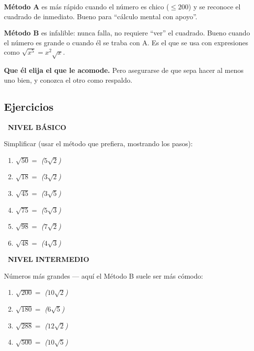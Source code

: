 \documentclass[11pt,a4paper]{article}
\newcommand{\nivelbasico}{%
  \par\smallskip\colorbox{green!60!black}{\color{white}\small\bfseries\ NIVEL BÁSICO\ }\par\smallskip}
\newcommand{\nivelintermedio}{%
  \par\smallskip\colorbox{naranja}{\color{white}\small\bfseries\ NIVEL INTERMEDIO\ }\par\smallskip}
\begin{document}
\begin{tcolorbox}[guia-tutor, title={\color{tutormorado} CUÁNDO USAR A Y CUÁNDO B}]
\textbf{Método A} es más rápido cuando el número es chico ($\leq 200$) y se reconoce el cuadrado de inmediato. Bueno para ``cálculo mental con apoyo''.

\textbf{Método B} es infalible: nunca falla, no requiere ``ver'' el cuadrado. Bueno cuando el número es grande o cuando él se traba con A. Es el que se usa con expresiones como $\sqrt{x^{5}} = x^{2}\sqrt{x}$.

\textbf{Que él elija el que le acomode.} Pero asegurarse de que sepa hacer al menos uno bien, y conozca el otro como respaldo.
\end{tcolorbox}

\subsection{Ejercicios}

\nivelbasico

Simplificar (usar el método que prefiera, mostrando los pasos):
\begin{enumerate}[label=\textbf{\arabic*.},leftmargin=1cm,itemsep=8pt]
  \item $\sqrt{50} = $ \hfill \textit{($5\sqrt{2}$)}
  \item $\sqrt{18} = $ \hfill \textit{($3\sqrt{2}$)}
  \item $\sqrt{45} = $ \hfill \textit{($3\sqrt{5}$)}
  \item $\sqrt{75} = $ \hfill \textit{($5\sqrt{3}$)}
  \item $\sqrt{98} = $ \hfill \textit{($7\sqrt{2}$)}
  \item $\sqrt{48} = $ \hfill \textit{($4\sqrt{3}$)}
\end{enumerate}

\nivelintermedio

Números más grandes --- aquí el Método B suele ser más cómodo:
\begin{enumerate}[label=\textbf{\arabic*.},leftmargin=1cm,itemsep=8pt,start=7]
  \item $\sqrt{200} = $ \hfill \textit{($10\sqrt{2}$)}
  \item $\sqrt{180} = $ \hfill \textit{($6\sqrt{5}$)}
  \item $\sqrt{288} = $ \hfill \textit{($12\sqrt{2}$)}
  \item $\sqrt{500} = $ \hfill \textit{($10\sqrt{5}$)}
\end{enumerate}
\end{document}
